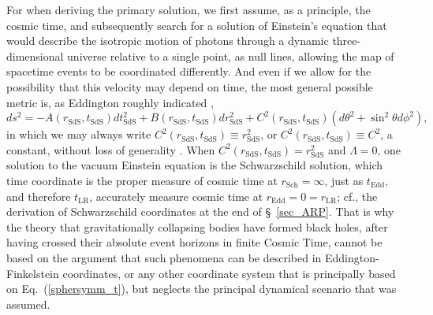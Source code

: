 For when deriving the primary solution, we first assume, as a principle, the cosmic time, and subsequently search for a solution of Einstein's equation that would describe the isotropic motion of photons through a dynamic three-dimensional universe relative to a single point, as null lines, allowing the map of spacetime events to be coordinated differently. And even if we allow for the possibility that this velocity may depend on time, the most general possible metric is, as Eddington roughly indicated \cite{Eddington1923},
\begin{equation}
ds^2=-A(r_{\mathrm{SdS}},t_{\mathrm{SdS}})dt_{\mathrm{SdS}}^2+B(r_{\mathrm{SdS}},t_{\mathrm{SdS}})
dr_{\mathrm{SdS}}^2+C^2(r_{\mathrm{SdS}},t_{\mathrm{SdS}})\left(d\theta^2+\sin^2\theta{d\phi^2}\right),\label{sphersymm_t}
\end{equation}
in which we may always write $C^2(r_{\mathrm{SdS}},t_{\mathrm{SdS}})\equiv{r_{\mathrm{SdS}}^2}$, or $C^2(r_{\mathrm{SdS}},t_{\mathrm{SdS}})\equiv{C^2}$, a constant, without loss of generality \cite{Ehlers2006}. When $C^2(r_{\mathrm{SdS}},t_{\mathrm{SdS}})={r_{\mathrm{SdS}}^2}$ and $\Lambda=0$, one solution to the vacuum Einstein equation is the Schwarzschild solution, which time coordinate is the proper measure of cosmic time at $r_{\mathrm{Sch}}=\infty$, just as $t_{\mathrm{Edd}}$, and therefore $t_{\mathrm{LR}}$, accurately measure cosmic time at $r_{\mathrm{Edd}}=0=r_{\mathrm{LR}}$; cf., the derivation of Schwarzschild coordinates at the end of \S~\ref{sec_ARP}. That is why the theory that gravitationally collapsing bodies have formed black holes, after having crossed their absolute event horizons in finite Cosmic Time, cannot be based on the argument that such phenomena can be described in Eddington-Finkelstein coordinates, or any other coordinate system that is principally based on Eq.~(\ref{sphersymm_t}), but neglects the principal dynamical scenario that was assumed.

